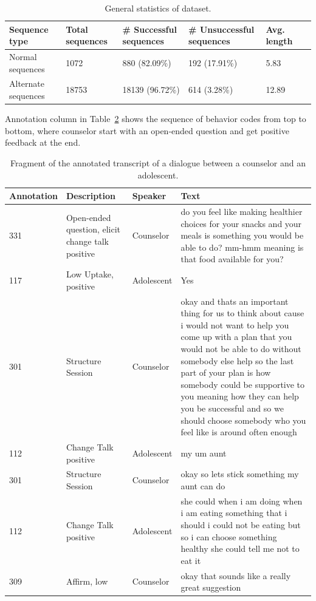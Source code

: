 \documentclass{amia}
\begin{document}
\begin{table}[h]
\centering
\caption{General statistics of dataset.}
\label{tab:data_dist}
  \begin{tabular}{|l|l|l|l|l|l|}
  \hline
   \textbf{Sequence type} & \textbf{Total sequences}  & \textbf{\# Successful sequences}  & \textbf{\# Unsuccessful sequences} & \textbf{Avg. length} \\ \hline      
 Normal sequences & 1072 & 880 (82.09\%) & 192 (17.91\%) & 5.83 \\\hline
Alternate sequences & 18753 & 18139 (96.72\%) & 614 (3.28\%) & 12.89 \\\hline 
  \end{tabular}
\end{table} 

Annotation column in Table~\ref{tab:anno_examp} shows the sequence of behavior codes from top to bottom, where counselor start with an open-ended question and get positive feedback at the end. \\

\begin{table}[h]
\caption{Fragment of the annotated transcript of a dialogue between a counselor and an adolescent.}    
\label{tab:anno_examp}
\centering
\begin{tabular}{|l|p{3.6cm}|l|p{8cm}|}
\hline
Annotation  & Description & Speaker & Text \\\hline
331 &	Open-ended question, elicit change talk positive &	Counselor &	do you feel like making healthier choices for your snacks and your meals is something you would be able to do? mm-hmm meaning is that food available for you? \\\hline
117 &	Low Uptake, positive	& Adolescent &	Yes \\\hline
301 &	Structure Session	& Counselor &	okay and thats an important thing for us to think about cause i would not want to help you come up with a plan that you would not be able to do without somebody else help so the last part of your plan is how somebody could be supportive to you meaning how they can help you be successful and so we should choose somebody who you feel like is around often enough \\\hline
112 &	Change Talk positive	& Adolescent &	my um aunt \\\hline
301 &	Structure Session	& Counselor &	okay so lets stick something my aunt can do \\\hline
112 &	Change Talk positive &	Adolescent &	she could when i am doing when i am eating something that i should i could not be eating but so i can choose something healthy she could tell me not to eat it \\\hline
309 &	Affirm, low &	Counselor &	okay that sounds like a really great suggestion \\\hline
\end{tabular}
\end{table}  
\end{document}
